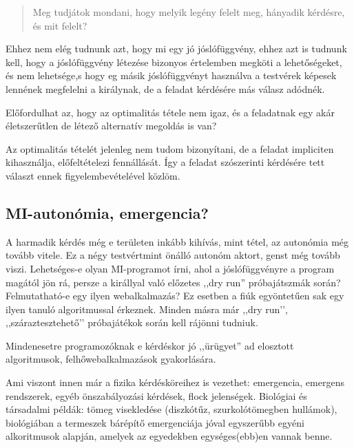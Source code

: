 \documentclass{article}
\begin{document}
	\begin{quotation}
		Meg tudjátok mondani, hogy melyik legény felelt meg, hányadik kérdésre, és mit felelt?
	\end{quotation}

	Ehhez nem elég tudnunk azt, hogy mi egy jó jóslófüggvény, ehhez azt is tudnunk kell, hogy a jóslófüggvény létezése bizonyos értelemben megköti a lehetőségeket, és nem lehetsége,s hogy eg másik jóslófüggvényt használva a testvérek képesek lennének megfelelni a királynak, de a feladat kérdésére más válasz adódnék.

	Előfordulhat az, hogy az optimalitás tétele nem igaz, és a feladatnak egy akár életszerűtlen de létező alternatív megoldás is van?

	Az optimalitás tételét jelenleg nem tudom bizonyítani, de a feladat impliciten kihasználja, előfeltételezi fennállását. Így a feladat szószerinti kérdésére tett választ ennek figyelembevételével közlöm.

	\subsection{MI-autonómia, emergencia?}

	A harmadik kérdés még e területen inkább kihívás, mint tétel, az autonómia még tovább vitele. Ez a négy testvértmint önálló autonóm aktort, genst még tovább viszi. Lehetséges-e olyan MI-programot írni, ahol a jóslófüggvényre a program magától jön rá, persze a királlyal való előzetes ,,dry run'' próbajátszmák során? Felmutatható-e egy ilyen webalkalmazás? Ez esetben a fiúk egyöntetűen sak egy ilyen tanuló algoritmussal érkeznek. Minden másra már ,,dry run’’, ,,száraztesztehető’’ próbajátékok során kell rájönni tudniuk.

	Mindenesetre programozóknak e kérdéskor jó ,,ürügyet'' ad elosztott algoritmusok, felhőwebalkalmazások gyakorlására.

	Ami viszont innen már a fizika kérdésköreihez is vezethet: emergencia, emergens rendszerek, egyéb önszabályozási kérdések, flock jelenségek. Biológiai és társadalmi példák: tömeg visekledése (diszkótűz, szurkolótömegben hullámok), biológiában a termeszek bárépítő emergenciája jóval egyszerűbb egyéni alkoritmusok alapján, amelyek az egyedekben egységes(ebb)en vannak benne.
\end{document}
